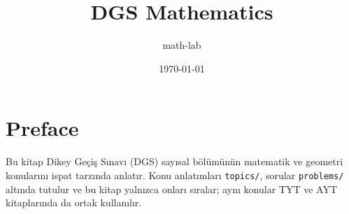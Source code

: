 \documentclass[11pt,a4paper]{book}
\title{DGS Mathematics}
\author{math-lab}
\date{\today}
\begin{document}
\frontmatter
\maketitle

\chapter*{Preface}
Bu kitap Dikey Geçiş Sınavı (DGS) sayısal bölümünün matematik ve geometri
konularını ispat tarzında anlatır. Konu anlatımları \texttt{topics/}, sorular
\texttt{problems/} altında tutulur ve bu kitap yalnızca onları sıralar; aynı
konular TYT ve AYT kitaplarında da ortak kullanılır.

\tableofcontents

\mainmatter

%   
%
%
%
\end{document}
